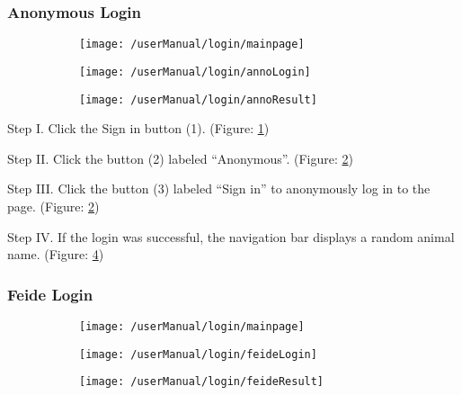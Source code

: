 \subsubsection{Anonymous Login}
\begin{figure}[H]
    \centering
    \begin{subfigure}{0.60\linewidth}
        \texttt{[image: /userManual/login/mainpage]}
       	\caption{}
		\label{fig:annoMainPage}	
    \end{subfigure}
    \begin{subfigure}{0.60\linewidth}
        \texttt{[image: /userManual/login/annoLogin]}
      	\caption{}
		\label{fig:annoLogin}	
    \end{subfigure}
    \begin{subfigure}{0.60\linewidth}
    	\texttt{[image: /userManual/login/annoResult]}
    	\caption{}
    	\label{fig:annoResult}	
    \end{subfigure}
\end{figure}

\begin{userManualItemlist}
	\item[Step I.] Click the Sign in button (1). (Figure: \ref{fig:annoMainPage})
	\item[Step II.] Click the button (2) labeled “Anonymous”. (Figure: \ref{fig:annoLogin})
	\item[Step III.] Click the button (3) labeled “Sign in” to anonymously log in to the page. (Figure: \ref{fig:annoLogin})
	\item[Step IV.] If the login was successful, the navigation bar displays a random animal name. (Figure: \ref{fig:annoResult})
\end{userManualItemlist}

\subsubsection{Feide Login}
\begin{figure}[H]
    \centering
    \begin{subfigure}{0.60\linewidth}
        \texttt{[image: /userManual/login/mainpage]}
       	\caption{}
		\label{fig:feideMainPage}	
    \end{subfigure}
    \begin{subfigure}{0.60\linewidth}
        \texttt{[image: /userManual/login/feideLogin]}
      	\caption{}
		\label{fig:feideLogin}	
    \end{subfigure}
     \begin{subfigure}{0.60\linewidth}
        \texttt{[image: /userManual/login/feideResult]}
      	\caption{}
		\label{fig:feideResult}	
    \end{subfigure}
\end{figure}

